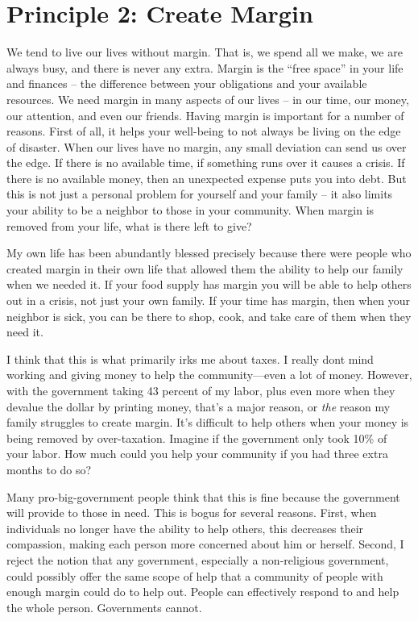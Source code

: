 \section{Principle 2: Create Margin}

We tend to live our lives without margin. That is, we spend all we make,
we are always busy, and there is never any extra. Margin is the “free
space” in your life and finances – the difference between your
obligations and your available resources.  We need margin in many
aspects of our lives – in our time, our money, our attention, and even
our friends.  Having margin is important for a number of reasons. 
First of all, it helps your well-being to not always be living on the
edge of disaster.  When our lives have no margin, any small deviation
can send us over the edge.  If there is no available time, if something
runs over it causes a crisis.  If there is no available money, then an
unexpected expense puts you into debt.  But this is not just a personal
problem for yourself and your family – it also limits your ability to
be a neighbor to those in your community. 
When margin is
removed from your life, what is there left to give?  

My own life has been abundantly blessed precisely because there were
people who created margin in their own life that allowed them the
ability to help our family when we needed it. If your food supply has
margin you will be able to help others out
in a crisis, not just
your own family.  If
your time has margin, then when your neighbor is sick, you can be there
to shop, cook, and take care of them when they need it.

I think that this is what primarily irks me about taxes. I really
don{\textquotesingle}t mind working and giving money to help the
community—even a lot of money. However, with the government taking 43
percent of my labor,
plus even more when they devalue the dollar by printing money, 
that’s a major reason,
or \textit{the
}reason my family
struggles to create margin. It’s difficult to help others when your
money is being removed by over-taxation.  Imagine if the government
only took 10\% of your labor.  How much could you help your community
if you had three extra months to do so?

Many pro-big-government people think that this is fine because the
government will provide to those in need. This is bogus for several
reasons. First, when individuals no longer have the ability to help
others, this decreases
their compassion,
making each person more concerned about him or herself.  Second, I
reject the notion that
any government,
especially a non-religious government, could possibly offer the same
scope of help that a
community of people with enough margin could do to help out. People
can effectively respond to and help the whole person. Governments
cannot. 

